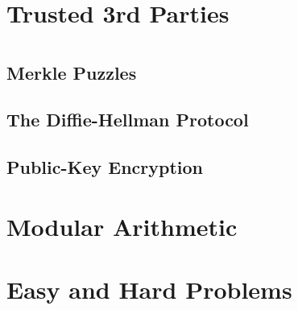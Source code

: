 
\section{Trusted 3rd Parties}


\section{}


\subsection{Merkle Puzzles}


\subsection{The Diffie-Hellman Protocol}


\subsection{Public-Key Encryption}


\section{Modular Arithmetic}


\section{Easy and Hard Problems}